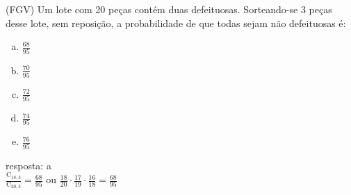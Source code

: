 \begin{ex}
 (FGV) Um lote com 20 peças contém duas defeituosas. Sorteando-se 3 peças desse lote, sem reposição, a probabilidade de que todas sejam não defeituosas é:
    \begin{enumerate}[(a)]
    \item $\frac{68}{95}$
    \item $\frac{70}{95}$
    \item $\frac{72}{95}$
    \item $\frac{74}{95}$
    \item $\frac{76}{95}$
    \end{enumerate}
      \begin{sol}
       resposta: a \\
       $\frac{\mathrm{C}_{{18},3}}{\mathrm{C}_{{20},3}}=\frac{68}{95}$
       \hspace{0.4cm}ou\hspace{0,4cm}  
       $\frac{18}{20}\cdot\frac{17}{19}\cdot\frac{16}{18}=\frac{68}{95}$
      \end{sol}
\end{ex}
